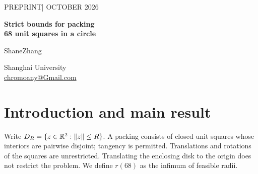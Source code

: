 \documentclass[11pt]{article}
\begin{document}
\thispagestyle{plain}
\begin{center}
{\small\sffamily\color{Muted} PREPRINT\quad | OCTOBER 2026\par}
\vspace{13pt}
{\fontsize{22}{25}\selectfont\bfseries\color{Ink}
Strict bounds for packing\\[2pt]
68 unit squares in a circle\par}
\vspace{14pt}
{\large ShaneZhang\par}
\vspace{4pt}
Shanghai University\\[2pt]
\href{mailto:chromoany@Gmail.com}{\small chromoany@Gmail.com}
\end{center}
\vspace{10pt}
\begin{abstract}

Let $r(68)$ be the infimum of radii of disks containing 68 unit squares with arbitrary orientations and pairwise disjoint interiors. We give a rational-coordinate construction and a computer-assisted exclusion proving
\[
\frac{39}{8}<r(68)<5.031404629453352.
\]
The construction has an exact enclosing radius specified by a quadratic equation with integer coefficients and an isolating interval of width $10^{-30}$. The lower bound uses a nonnegative radial weight on 80 annuli. Its single-square inequality is verified on a complete subdivision of a continuous two-dimensional domain, using exact rational arithmetic and outward interval bounds. Coordinates, weights, subdivision data and verification programs accompany the paper. The exact optimum and feasibility at radius $5$ remain open.

\end{abstract}
\smallskip
{}

\section{Introduction and main result}
Write $D_R=\{z\in\mathbb R^2:\|z\|\le R\}$. A packing consists of closed unit squares whose interiors are pairwise disjoint; tangency is permitted. Translations and rotations of the squares are unrestricted. Translating the enclosing disk to the origin does not restrict the problem. We define $r(68)$ as the infimum of feasible radii.
\end{document}
